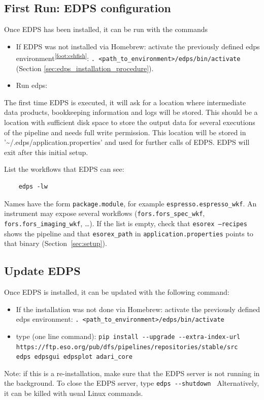 \subsection{First Run: EDPS configuration}
\label{sec:edps_configuration}
Once EDPS has been installed, it can be run with the commands
\begin{itemize}

\item If EDPS was not installed via Homebrew: activate the previously defined edps environment\textsuperscript{\ref{foot:cshfish}}:\newline
{\tt . <path\_to\_environment>/edps/bin/activate} (Section \ref{sec:edps_installation_procedure}).

\item   Run edps:
\end{itemize}

The first time EDPS is executed, it will ask for a location where intermediate data products, bookkeeping information and logs will be stored. This should be a location with sufficient disk space to store the output data for several executions of the pipeline and needs full write permission. This location will be stored in '\textasciitilde/.edps/application.properties' and used for further calls of EDPS. EDPS will exit after this initial setup. 

List the workflows that EDPS can see:

\begin{verbatim}
    edps -lw
\end{verbatim}

Names have the form {\tt package.module}, for example {\tt espresso.espresso\_wkf}. An instrument may expose several workflows ({\tt fors.fors\_spec\_wkf}, {\tt fors.fors\_imaging\_wkf}, \ldots). If the list is empty, check that {\tt esorex --recipes} shows the pipeline and that {\tt esorex\_path} in {\tt application.properties} points to that binary (Section~\ref{sec:setup}).



\subsection{Update EDPS}
Once  EDPS is installed, it can be updated with the following command:
\begin{itemize}

\item If the installation was not done via Homebrew: activate the previously defined edps environment:\newline
{\tt . <path\_to\_environment>/edps/bin/activate}
\item type (one line command):\newline
\verb |pip install --upgrade --extra-index-url |\newline
\verb |  https://ftp.eso.org/pub/dfs/pipelines/repositories/stable/src | \newline
\verb|  edps edpsgui edpsplot adari_core|
\end{itemize}


Note: if this is a re-installation, make sure that the EDPS server is not running in the background. To close the EDPS server, type 
\verb|edps --shutdown |
Alternatively, it can be killed with usual Linux commands.
